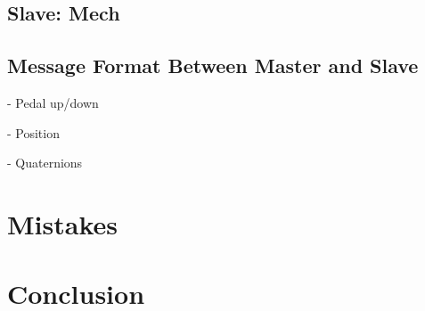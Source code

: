 \documentclass[letterpaper,twocolumn,10pt]{article}
\begin{document}
\subsection{Slave: Mech} %

\subsection{Message Format Between Master and Slave}
- Pedal up/down

- Position

- Quaternions

\section{Mistakes}

\section{Conclusion}



\end{document}
